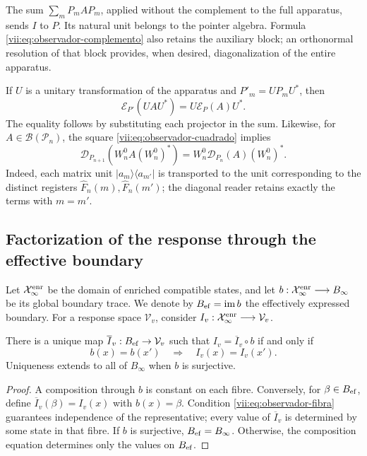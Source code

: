 The sum \(\sum_mP_mAP_m\), applied without the complement to the full
apparatus, sends \(I\) to \(P\). Its natural unit belongs to the
pointer algebra. Formula \eqref{vii:eq:observador-complemento} also retains
the auxiliary block; an orthonormal resolution of that block
provides, when desired, diagonalization of the entire apparatus.

If \(U\) is a unitary transformation of the apparatus and
\(P'_m=UP_mU^*\), then
\[
 \mathcal E_{P'}(UAU^*)=U\mathcal E_P(A)U^*.
\]
The equality follows by substituting each projector in the sum.
Likewise, for \(A\in\mathcal B(\mathcal P_n)\), the square
\eqref{vii:eq:observador-cuadrado} implies
\[
 \mathcal D_{P_{n+1}}(W_n^0A(W_n^0)^*)
 =W_n^0\mathcal D_{P_n}(A)(W_n^0)^*.
\]
Indeed, each matrix unit \(|a_m\rangle\langle a_{m'}|\)
is transported to the unit corresponding to the distinct registers
\(\widehat F_n(m),\widehat F_n(m')\); the diagonal reader retains
exactly the terms with \(m=m'\).

\subsection{Factorization of the response through the effective boundary}
\label{vii:sec:observador-factorizacion}

Let \(\mathcal X_\infty^{\rm enr}\) be the domain of enriched
compatible states, and let
\(b:\mathcal X_\infty^{\rm enr}\longrightarrow B_\infty\) be its global
boundary trace. We denote by \(B_{\rm ef}=\operatorname{im}b\)
the effectively expressed boundary. For a response space
\(\mathcal V_v\), consider
\(I_v:\mathcal X_\infty^{\rm enr}\longrightarrow\mathcal V_v\).

\begin{theorem}
\label{vii:thm:observador-factorizacion}
There is a unique map \(\overline I_v:B_{\rm ef}\to\mathcal V_v\)
such that \(I_v=\overline I_v\circ b\) if and only if
\begin{equation}
 b(x)=b(x')\quad\Longrightarrow\quad I_v(x)=I_v(x').
 \label{vii:eq:observador-fibra}
\end{equation}
Uniqueness extends to all of \(B_\infty\) when \(b\) is
surjective.
\end{theorem}

\begin{proof}
A composition through \(b\) is constant on each fibre. Conversely,
for \(\beta\in B_{\rm ef}\), define
\(\overline I_v(\beta)=I_v(x)\) with \(b(x)=\beta\).
Condition \eqref{vii:eq:observador-fibra} guarantees independence
of the representative; every value of \(\overline I_v\) is determined
by some state in that fibre. If \(b\) is surjective,
\(B_{\rm ef}=B_\infty\). Otherwise, the composition equation
determines only the values on \(B_{\rm ef}\).
\end{proof}

